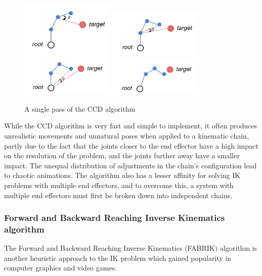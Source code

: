 \begin{figure}
    \centering
    \captionsetup{justification=centering}
    \includegraphics[width=0.4\textwidth]{grafika/ccd_1}
    \includegraphics[width=0.4\textwidth]{grafika/ccd_2}
    \includegraphics[width=0.4\textwidth]{grafika/ccd_3}
    \includegraphics[width=0.4\textwidth]{grafika/ccd_4}
    \caption{A single pass of the CCD algorithm}
    \label{fig:ccd}
\end{figure}

While the CCD algorithm is very fast and simple to implement, it often produces
unrealistic movements and unnatural poses when applied to a kinematic chain,
partly due to the fact that the joints closer to the end effector have a high
impact on the resolution of the problem, and the joints further away have
a smaller impact. The unequal distribution of adjustments in the chain's
configuration lead to chaotic animations. The algorithm also has a lesser
affinity for solving IK problems with multiple end effectors, and to overcome
this, a system with multiple end effectors must first be broken down into
independent chains.

\subsubsection{Forward and Backward Reaching Inverse Kinematics algorithm}
The Forward and Backward Reaching Inverse Kinematics (FABRIK) algorithm
\cite{Aristidou2011} is another heuristic approach to the IK problem which
gained popularity in computer graphics and video games. 


